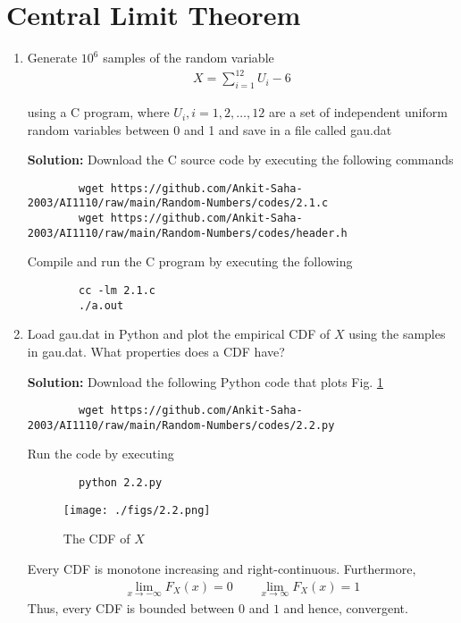 \documentclass[journal,12pt,twocolumn]{IEEEtran}
\newcommand{\solution}{\noindent \textbf{Solution: }}
\numberwithin{equation}{section}
\renewcommand\thesection{\arabic{section}}
\begin{document}
	\section{Central Limit Theorem}

	\begin{enumerate}[label=\thesection.\arabic*,ref=\thesection.\theenumi]
	\item Generate $10^6$ samples of the random variable
	\begin{align}
		X = \sum_{i=1}^{12}U_i -6
	\end{align}

	using a C program, where $U_i, i = 1,2,\dots, 12$ are  a set of independent uniform random variables between 0 and 1 and save in a file called gau.dat
	
	\solution Download the C source code by executing the following commands
	\begin{lstlisting}
		wget https://github.com/Ankit-Saha-2003/AI1110/raw/main/Random-Numbers/codes/2.1.c
		wget https://github.com/Ankit-Saha-2003/AI1110/raw/main/Random-Numbers/codes/header.h
	\end{lstlisting}
	Compile and run the C program by executing the following
	\begin{lstlisting}
		cc -lm 2.1.c
		./a.out
	\end{lstlisting}
		
	\item Load gau.dat in Python and plot the empirical CDF of $X$ using the samples in gau.dat. What properties does a CDF have?

	\solution Download the following Python code that plots Fig. \ref{fig-2.2}
	\begin{lstlisting}
		wget https://github.com/Ankit-Saha-2003/AI1110/raw/main/Random-Numbers/codes/2.2.py
	\end{lstlisting}
	Run the code by executing
	\begin{lstlisting}
		python 2.2.py
	\end{lstlisting}
	\begin{figure}
		\centering
		\texttt{[image: ./figs/2.2.png]}
		\caption{The CDF of $X$}
		\label{fig-2.2}
	\end{figure}
	
	Every CDF is monotone increasing and right-continuous. Furthermore,
	\begin{align}
		\lim_{x \to -\infty} F_{X}(x) = 0 \qquad \lim_{x \to \infty} F_{X}(x) = 1
	\end{align}
	Thus, every CDF is bounded between $0$ and $1$ and hence, convergent.
	

\end{enumerate}
\end{document}
